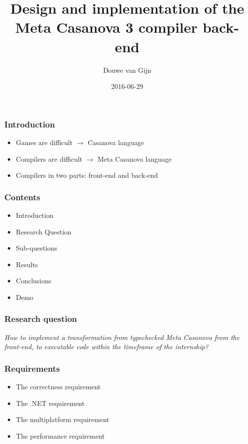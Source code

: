 \documentclass[xetex,serif]{beamer}
\title{Design and implementation of the\\Meta Casanova 3 compiler back-end}
\author{Douwe van Gijn}
\date{2016-06-29}
\begin{document}
\begin{frame}
\titlepage

\end{frame}\begin{frame}\frametitle{Introduction}
\begin{itemize}
    \item Games are difficult $\longrightarrow$ Casanova language
    \item Compilers are difficult $\longrightarrow$ Meta Casanova language
    \item Compilers in two parts: front-end and back-end
\end{itemize}

\end{frame}\begin{frame}\frametitle{Contents}
\begin{itemize}
    \item Introduction
    \item Research Question
    \item Sub-questions
    \item Results
    \item Conclusions
    \item Demo
\end{itemize}

\end{frame}\begin{frame}\frametitle{Research question}
\textit{How to implement a transformation from typechecked Meta Casanova from the front-end, to executable code within the timeframe of the internship?}

\end{frame}\begin{frame}\frametitle{Requirements}
\begin{itemize}
    \item The correctness requirement
    \item The .NET requirement
    \item The multiplatform requirement
    \item The performance requirement
\end{itemize}


\end{frame}
\end{document}
